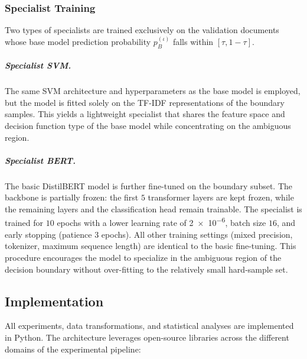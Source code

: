 \documentclass[a4paper,fleqn]{cas-dc}
\newcommand{\idx}{\iota}
\newcommand{\mBase}{B}
\newcommand{\thresh}{\tau}
\newcommand{\probSmall}[1]{p_{#1}}
\begin{document}
\subsubsection{Specialist Training} \label{sec:specialist_training}

Two types of specialists are trained exclusively on the validation documents whose base model prediction probability $\probSmall{\mBase}^{(\idx)}$ falls within $[\thresh, 1-\thresh]$.

\subparagraph{Specialist SVM.} The same SVM architecture and hyperparameters as the base model is employed, but the model is fitted solely on the TF-IDF representations of the boundary samples. This yields a lightweight specialist that shares the feature space and decision function type of the base model while concentrating on the ambiguous region.

\subparagraph{Specialist BERT.} The basic DistilBERT model is further fine-tuned on the boundary subset. The backbone is partially frozen: the first $5$ transformer layers are kept frozen, while the remaining layers and the classification head remain trainable. The specialist is trained for $10$ epochs with a lower learning rate of \num{2e-6}, batch size $16$, and early stopping (patience $3$ epochs). All other training settings (mixed precision, tokenizer, maximum sequence length) are identical to the basic fine-tuning. This procedure encourages the model to specialize in the ambiguous region of the decision boundary without over-fitting to the relatively small hard-sample set.

\subsection{Implementation}

All experiments, data transformations, and statistical analyses are implemented in Python. The architecture leverages open-source libraries across the different domains of the experimental pipeline:
\end{document}
